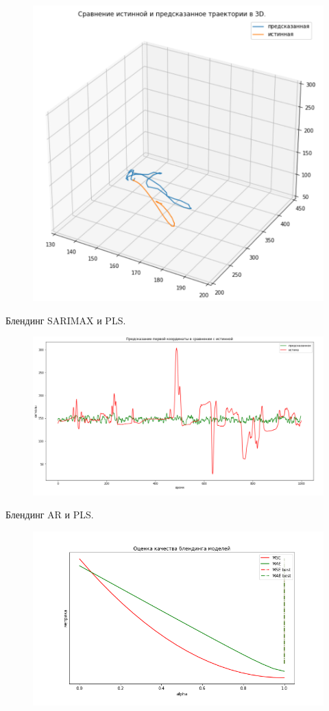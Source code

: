 \documentclass{article}
\begin{document}
\begin{figure}[H]
\includegraphics[scale=0.34]{images/4.png}
\end{figure}
Блендинг SARIMAX и PLS.
\begin{figure}[H]
\includegraphics[scale=0.34]{images/5.png}
\end{figure}

Блендинг AR и PLS.
\begin{figure}[H]
\includegraphics[scale=0.34]{images/6.png}
\end{figure}
\end{document}
